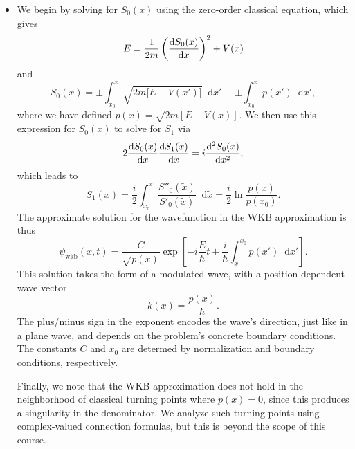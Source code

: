 \documentclass[11pt, a4paper]{article}
\newcommand{\diff}{\mathop{}\!\mathrm{d}} %
\begin{document}
\begin{itemize}
    \item We begin by solving for $ S_{0}(x) $ using the zero-order classical equation, which gives
    \begin{equation*}
        E = \frac{1}{2m}\left( \dv{S_{0}(x)}{x} \right)^{2} + V(x)
    \end{equation*}
    and
    \begin{equation*}
        S_{0}(x) = \pm \int_{x_{0}}^{x} \sqrt{2m \big[ E - V(x') \big]}\diff x' \equiv \pm \int_{x_{0}}^{x}p(x')\diff x',
    \end{equation*}
    where we have defined $ p(x) = \sqrt{2m [E - V(x)]} $. We then use this expression for $ S_{0}(x) $ to solve for $ S_{1} $ via
    \begin{equation*}
        2 \dv{S_{0}(x)}{x} \dv{S_{1}(x)}{x} = i \dv[2]{S_{0}(x)}{x},
    \end{equation*}
    which leads to
    \begin{equation*}
        S_{1}(x) = \frac{i}{2} \int_{x_{0}}^{x}\frac{S''_{0}(\tilde{x})}{S'_{0}(\tilde{x})} \diff \tilde{x} = \frac{i}{2} \ln \frac{p(x)}{p(x_{0})}.
    \end{equation*}
    The approximate solution for the wavefunction in the WKB approximation is thus
    \begin{equation*}
        \psi_{\text{wkb}}(x, t) = \frac{C}{\sqrt{p(x)}}\exp \left[ -i \frac{E}{\hbar}t \pm \frac{i}{\hbar}\int_{x}^{x_{0}} p(x')\diff x' \right].
    \end{equation*}
    This solution takes the form of a modulated wave, with a position-dependent wave vector
    \begin{equation*}
        k(x) = \frac{p(x)}{\hbar}.
    \end{equation*}
    The plus/minus sign in the exponent encodes the wave's direction, just like in a plane wave, and depends on the problem's concrete boundary conditions. The constants $ C $ and $ x_{0} $ are determed by normalization and boundary conditions, respectively.

    Finally, we note that the WKB approximation does not hold in the neighborhood of classical turning points where $ p(x) = 0 $, since this produces a singularity in the denominator. We analyze such turning points using complex-valued connection formulas, but this is beyond the scope of this course.
    
    
\end{itemize}
\end{document}
